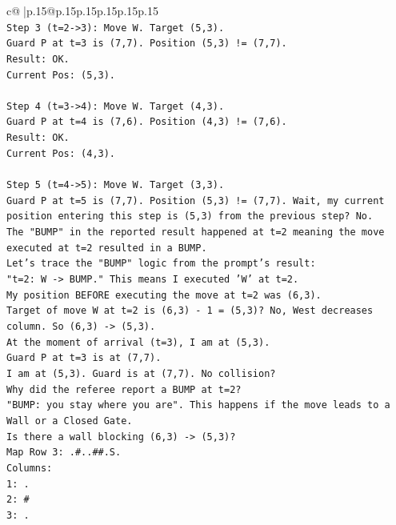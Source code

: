 \documentclass{article}
\begin{document}
{\begin{supertabular}{c@{$\;$}|p{.15\linewidth}@{}p{.15\linewidth}p{.15\linewidth}p{.15\linewidth}p{.15\linewidth}p{.15\linewidth}}
{{{\\ 
\texttt{Step 3 (t=2{-}>3): Move W. Target (5,3).} \\
\texttt{Guard P at t=3 is (7,7). Position (5,3) != (7,7).} \\
\texttt{Result: OK.} \\
\texttt{Current Pos: (5,3).} \\
\\ 
\texttt{Step 4 (t=3{-}>4): Move W. Target (4,3).} \\
\texttt{Guard P at t=4 is (7,6). Position (4,3) != (7,6).} \\
\texttt{Result: OK.} \\
\texttt{Current Pos: (4,3).} \\
\\ 
\texttt{Step 5 (t=4{-}>5): Move W. Target (3,3).} \\
\texttt{Guard P at t=5 is (7,7). Position (5,3) != (7,7). Wait, my current position entering this step is (5,3) from the previous step? No.} \\
\texttt{The "BUMP" in the reported result happened at t=2 meaning the move executed at t=2 resulted in a BUMP.} \\
\texttt{Let's trace the "BUMP" logic from the prompt's result:} \\
\texttt{"t=2: W {-}> BUMP." This means I executed 'W' at t=2.} \\
\texttt{My position BEFORE executing the move at t=2 was (6,3).} \\
\texttt{Target of move W at t=2 is (6,3) {-} 1 = (5,3)? No, West decreases column. So (6,3) {-}> (5,3).} \\
\texttt{At the moment of arrival (t=3), I am at (5,3).} \\
\texttt{Guard P at t=3 is at (7,7).} \\
\texttt{I am at (5,3). Guard is at (7,7). No collision?} \\
\texttt{Why did the referee report a BUMP at t=2?} \\
\texttt{"BUMP: you stay where you are". This happens if the move leads to a Wall or a Closed Gate.} \\
\texttt{Is there a wall blocking (6,3) {-}> (5,3)?} \\
\texttt{Map Row 3: .\#..\#\#.S.} \\
\texttt{Columns:} \\
\texttt{1: .} \\
\texttt{2: \#} \\
\texttt{3: .} \\
}}}
\end{supertabular}}
\end{document}
